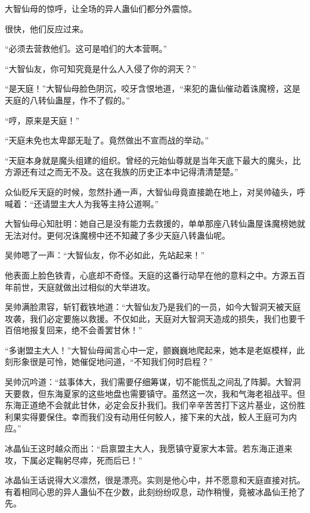 
\begin{this_body}



大智仙母的惊呼，让全场的异人蛊仙们都分外震惊。

很快，他们反应过来。

“必须去营救他们。这可是咱们的大本营啊。”

“大智仙友，你可知究竟是什么人入侵了你的洞天？”

“是天庭！”大智仙母脸色阴沉，咬牙含恨地道，“来犯的蛊仙催动着诛魔榜，这是天庭的八转仙蛊屋，作不了假的。”

“哼，原来是天庭！”

“天庭未免也太卑鄙无耻了。竟然做出不宣而战的举动。”

“天庭本身就是魔头组建的组织。曾经的元始仙尊就是当年天底下最大的魔头，比方源还有过之而无不及。这在我族的历史正本中记得清清楚楚。”

众仙贬斥天庭的时候，忽然扑通一声，大智仙母竟直接跪在地上，对吴帅磕头，呼喊着：“还请盟主大人为我等主持公道啊。”

大智仙母心知肚明：她自己是没有能力去救援的，单单那座八转仙蛊屋诛魔榜她就无法对付。更何况诛魔榜中还不知藏了多少天庭八转蛊仙呢。

吴帅嗯了一声：“大智仙友，你不必如此，先站起来！”

他表面上脸色铁青，心底却不奇怪。天庭的这番行动早在他的意料之中。方源五百年前世，天庭就做出过相似的大举进攻。

吴帅满脸肃容，斩钉截铁地道：“大智仙友乃是我们的一员，如今大智洞天被天庭攻袭，我们必定要施以救援。不仅如此，天庭对大智洞天造成的损失，我们也要千百倍地报复回来，绝不会善罢甘休！”

“多谢盟主大人！”大智仙母闻言心中一定，颤巍巍地爬起来，她本是老妪模样，此刻形象很是可怜，她催促地问道，“不知我们何时启程？”

吴帅沉吟道：“兹事体大，我们需要仔细筹谋，切不能慌乱之间乱了阵脚。大智洞天要救，但东海夏家的这些地盘也需要镇守。虽然这一次，我和气海老祖战平。但东海正道绝不会就此甘休，必定会反扑我们。我们辛辛苦苦打下这片基业，这份胜利果实得要保住。幸而我们没有动用任何鲛人，接下来的大战，鲛人王庭可为内应。”

冰晶仙王这时越众而出：“启禀盟主大人，我愿镇守夏家大本营。若东海正道来攻，下属必定鞠躬尽瘁，死而后已！”

冰晶仙王话说得大义凛然，很是漂亮。实则是他心中，并不愿意和天庭直接对抗。有着相同心思的异人蛊仙不在少数，此刻纷纷叹息，动作稍慢，竟被冰晶仙王抢了先。


\end{this_body}
